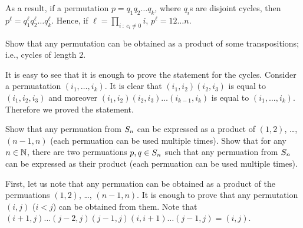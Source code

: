 \begin{chapterendexercises}
\begin{solution}
      As a result, if a permutation $p = q_1 q_2 \dots q_k$, where $q_i$s are
      disjoint cycles, then $p^\ell = q^\ell_1 q^\ell_2 \dots q^\ell_k$. Hence,
      if $\ell = \prod_{i ~:~ c_i \neq 0} i$, $p^\ell = 1 2 \dots n$.
    \end{solution}
  \exercise Show that any permutation can be obtained as a product of some
    transpositions; i.e., cycles of length $2$.
    \begin{solution}
      It is easy to see that it is enough to prove the statement for the cycles.
      Consider a permuatation $(i_1, \dots, i_k)$. It is clear that $(i_1, i_2)
      (i_2, i_3)$ is equal to $(i_1, i_2, i_3)$ and moreover $(i_1, i_2) (i_2,
      i_3) \dots (i_{k - 1}, i_k)$ is equal to $(i_1, \dots, i_k)$. Therefore we
      proved the statement.
    \end{solution}
  \exercise Show that any permuation from $S_{n}$ can be expressed as
    a product of $(1, 2)$, \dots, $(n - 1, n)$ (each permuation can be used
    multiple times).
  \exercise Show that for any $n \in {\mathbb{N}}$, there are two permuations $p, q \in
    S_{n}$ such that any permuation from $S_{n}$ can be expressed as
    their product (each permuation can be used multiple times).
    \begin{solution}
      First, let us note that any permuation can be obtained as a product of the
      permuations $(1, 2)$, \dots, $(n - 1, n)$. It is enough to prove that any
      permutation $(i ,j)$ ($i < j$) can be obtained from them. Note that 
      $(i + 1, j) \dots (j - 2, j)(j - 1, j)(i, i + 1) \dots (j - 1, j) = 
        (i, j)$.


\end{solution}
\end{chapterendexercises}
